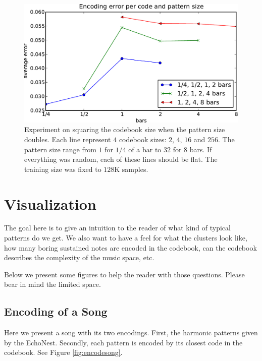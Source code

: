 \documentclass{article}
\begin{document}
\begin{figure}[htb]
\begin{center}
\includegraphics[width=.99\columnwidth]{codesize_patternsize}
\end{center}
\caption{\small{
Experiment on squaring the codebook size when the pattern size doubles.
Each line represent $4$ codebook sizes: $2$, $4$, $16$ and $256$.
The pattern size range from $1$ for $1/4$ of a bar to $32$ for $8$ bars.
If everything was random, each of these lines should be flat. The training
size was fixed to $128$K samples.
}}
\label{fig:size_pattern}
\end{figure}

\section{Visualization} \label{sec:visu}
The goal here is to give an intuition to the reader of what kind of
typical patterns do we get. We also want to have a feel for what the
clusters look like, how many boring sustained notes are encoded in the
codebook, can the codebook describes the complexity of the music space, etc.

Below we present some figures to help the reader with those questions.
Please bear in mind the limited space.

\subsection{Encoding of a Song}
Here we present a song with its two encodings. First, the harmonic patterns
given by the EchoNest. Secondly, each pattern is encoded by its closest
code in the codebook. See Figure \ref{fig:encodesong}.
\end{document}
